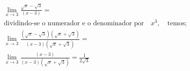 \begin{ex}
\begin{align}
&\lim_{x\rightarrow 3} \frac{\sqrt{x}-\sqrt{3}}{(x-3)}=\nonumber\\
&\text{dividindo-se o numerador e o denominador por}\quad{x^3},\quad\text{temos;}\nonumber\\
&\lim_{x\rightarrow 3} \frac{(\sqrt{x}-\sqrt{3})(\sqrt{x}+\sqrt{3})}{(x-3)(\sqrt{x}+\sqrt{3})}=\nonumber\\
&\lim_{x\rightarrow 3} \frac{(x-3)}{(x-3)(\sqrt{x}+\sqrt{3})}=\frac{1}{2\sqrt{3}}\nonumber
\end{align}
\end{ex}
